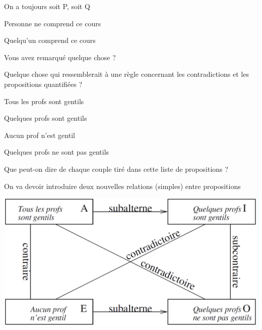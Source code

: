 \begin{frame}

			\begin{description}[labelindent=6pt,style=multiline,leftmargin=1.3in]
		 \setlength\itemsep{1em}
\item[Contradiction] On a toujours soit P, soit Q
	 \pause
\item[Exemple] Personne ne comprend ce cours \pause
\item[$\neg$] Quelqu'un comprend ce cours\pause
\item[Question] Vous avez remarqué quelque chose ?\pause
\item[] Quelque chose qui ressemblerait à une règle concernant les contradictions et les propositions quantifiées ?
	\end{description}
\end{frame}


\begin{frame}

			\begin{description}[labelindent=6pt,style=multiline,leftmargin=1.3in]
		 \setlength\itemsep{1em}
\item[A] Tous les profs sont gentils
	 \pause
\item[I] Quelques profs sont gentils\pause
\item[E] Aucun prof n'est gentil \pause
\item[O] Quelques profs ne sont pas gentils\pause
\item[Question] Que peut-on dire de chaque couple tiré dans cette liste de propositions ?\pause
\item[Indice] On va devoir introduire deux nouvelles relations (simples) entre propositions
	\end{description}
\end{frame}


\begin{frame}
\includegraphics[scale=0.32]{carre.png}
\end{frame}


